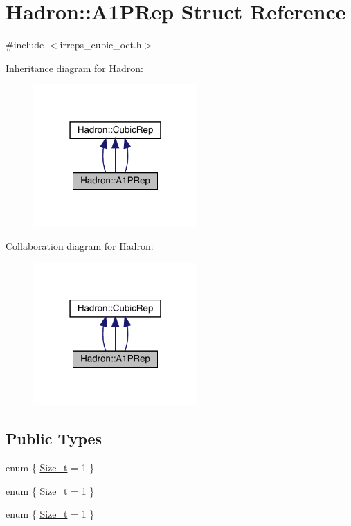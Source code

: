 \hypertarget{structHadron_1_1A1PRep}{}\section{Hadron\+:\+:A1\+P\+Rep Struct Reference}
\label{structHadron_1_1A1PRep}


{\ttfamily \#include $<$irreps\+\_\+cubic\+\_\+oct.\+h$>$}



Inheritance diagram for Hadron\+:
\nopagebreak
\begin{figure}[H]
\begin{center}
\leavevmode
\includegraphics[width=178pt]{da/dff/structHadron_1_1A1PRep__inherit__graph}
\end{center}
\end{figure}


Collaboration diagram for Hadron\+:
\nopagebreak
\begin{figure}[H]
\begin{center}
\leavevmode
\includegraphics[width=178pt]{df/d95/structHadron_1_1A1PRep__coll__graph}
\end{center}
\end{figure}
\subsection*{Public Types}
\begin{DoxyCompactItemize}
\item 
enum \{ \mbox{\hyperlink{structHadron_1_1A1PRep_a3cb55d4d0542640fbb40938b9d8dde23a818391020c14366c5159f7b053a876fa}{Size\+\_\+t}} = 1
 \}
\item 
enum \{ \mbox{\hyperlink{structHadron_1_1A1PRep_a3cb55d4d0542640fbb40938b9d8dde23a818391020c14366c5159f7b053a876fa}{Size\+\_\+t}} = 1
 \}
\item 
enum \{ \mbox{\hyperlink{structHadron_1_1A1PRep_a3cb55d4d0542640fbb40938b9d8dde23a818391020c14366c5159f7b053a876fa}{Size\+\_\+t}} = 1
 \}
\end{DoxyCompactItemize}
